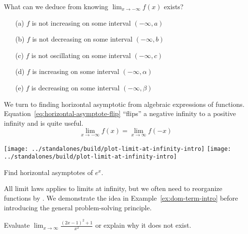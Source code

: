 \documentclass[../main.tex]{subfiles}
\begin{document}
  \bigskip

  \begin{example}
    What can we deduce from knowing \(\lim_{x \to -\infty} f(x)\) exists? 

    \begin{itemize}
      \item[(a)] \(f\) is not increasing on some interval \((-\infty, a)\)
      \item[(b)] \(f\) is not decreasing on some interval \((-\infty, b)\)
      \item[(c)] \(f\) is not oscillating on some interval \((-\infty, c)\)
      \item[(d)] \(f\) is increasing on some interval \((-\infty, \alpha)\)
      \item[(e)] \(f\) is decreasing on some interval \((-\infty, \beta)\)
    \end{itemize} 
  \end{example}
  \clearpage

  We turn to finding horizontal asymptotic from algebraic expressions of functions. Equation~\eqref{eq:horizontal-asymptote-flip} ``flips'' a negative infinity to a positive infinity and is quite useful.
  \begin{equation} \label{eq:horizontal-asymptote-flip}
    \lim_{x \to -\infty} f(x) = \lim_{x \to \infty} f(-x)
  \end{equation}
  \begin{center}
    \hfill{}
    \texttt{[image: ../standalones/build/plot-limit-at-infinity-intro]}
    \hfill{}
    \texttt{[image: ../standalones/build/plot-limit-at-infinity-intro]}
    \hfill{}
  \end{center}

  \begin{example}
    Find horizontal asymptotes of \(e^{x}\).

  \end{example}

  All limit laws applies to limits at infinity, but we often need to reorganize functions by . We demonstrate the idea in Example~\ref{ex:dom-term-intro} before introducing the general problem-solving principle.

  \begin{example}\label{ex:dom-term-intro}
    Evaluate \(\lim_{x \to \infty} \frac{(2x-1)^{2} + 1}{x^{2}}\) or explain why it does not exist.

  \end{example}
  \clearpage
\end{document}
